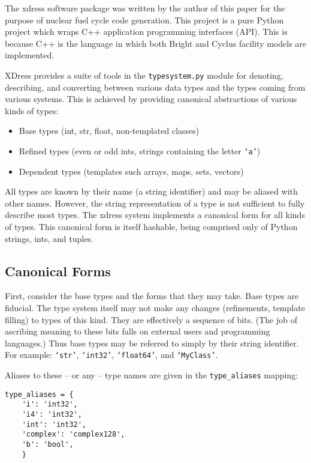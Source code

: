 \documentclass{ansconfpaper}
\newcommand{\vin}[1]{\texttt{{#1}}}
\begin{document}
The xdress software package \cite{xdress} was written by the author of this paper for 
the purpose of nuclear fuel cycle code generation.  This project is a pure Python 
project which wraps C++ application programming interfaces (API).  This is because
C++ is the language in which both Bright and Cyclus facility models are implemented.

XDress provides a suite of tools in the \vin{typesystem.py} module for denoting, 
describing, and converting
between various data types and the types coming from various systems.  This is
achieved by providing canonical abstractions of various kinds of types:

\begin{itemize}
    \item Base types (int, str, float, non-templated classes)
    \item Refined types (even or odd ints, strings containing the letter \vin{`a'})
    \item Dependent types (templates such arrays, maps, sets, vectors)
\end{itemize}

All types are known by their name (a string identifier) and may be aliased with 
other names.  However, the string representation of a type is not sufficient to 
fully describe most types.  The xdress system implements a canonical form for all 
kinds of types.  This canonical form is itself hashable, being comprised only of 
Python strings, ints, and tuples.

\subsection{Canonical Forms}
\label{sec:canon}

First, consider the base types and the forms that they may take.  Base types
are fiducial.  The type system itself may not make any changes (refinements, 
template filling) to types of this kind.  They are effectively a sequence of bits.
(The job of ascribing meaning to these bits falls on external users and programming 
languages.)  Thus base types may be referred to simply by their string identifier.  
For example: \vin{`str'}, \vin{`int32'}, \vin{`float64'}, and \vin{`MyClass'}.

Aliases to these -- or any -- type names are given in the \vin{type\_aliases} 
mapping:
\begin{lstlisting}
type_aliases = {
    'i': 'int32',
    'i4': 'int32',
    'int': 'int32',
    'complex': 'complex128',
    'b': 'bool',
    }
\end{lstlisting}
\end{document}
